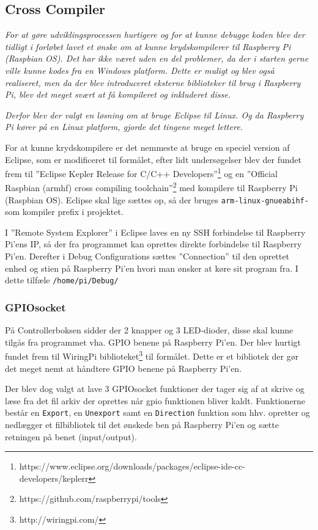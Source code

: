 \subsection*{Cross Compiler}

\textit{For at gøre udviklingsprocessen hurtigere og for at kunne debugge koden blev der tidligt i forløbet lavet et ønske om at kunne krydskompilerer til Raspberry Pi (Raspbian OS). Det har ikke været uden en del problemer, da der i starten gerne ville kunne kodes fra en Windows platform. Dette er muligt og blev også realiseret, men da der blev introduceret eksterne biblioteker til brug i Raspberry Pi, blev det meget svært at få kompileret og inkluderet disse.}

\textit{Derfor blev der valgt en løsning om at bruge Eclipse til Linux. Og da Raspberry Pi kører på en Linux platform, gjorde det tingene meget lettere.}

For at kunne krydskompilere er det nemmeste at bruge en speciel version af Eclipse, som er modificeret til formålet, efter lidt undersøgelser blev der fundet frem til ''Eclipse Kepler Release for C/C++ Developers''\footnote{https://www.eclipse.org/downloads/packages/eclipse-ide-cc-developers/keplerr} og en ''Official Raspbian (armhf) cross compiling toolchain''\footnote{https://github.com/raspberrypi/tools} med kompilere til Raspberry Pi (Raspbian OS). Eclipse skal lige sættes op, så der bruges \verb+arm-linux-gnueabihf-+ som kompiler prefix i projektet.

I ''Remote System Explorer'' i Eclipse laves en ny SSH forbindelse til Raspberry Pi'ens IP, så der fra programmet kan oprettes direkte forbindelse til Raspberry Pi'en. Derefter i Debug Configurations sættes ''Connection'' til den oprettet enhed og stien på Raspberry Pi'en hvori man ønsker at køre sit program fra. I dette tilfæle \verb+/home/pi/Debug/+

\subsubsection*{GPIOsocket}

På Controllerboksen sidder der 2 knapper og 3 LED-dioder, disse skal kunne tilgås fra programmet vha. GPIO benene på Raspberry Pi'en. Der blev hurtigt fundet frem til WiringPi biblioteket\footnote{http://wiringpi.com/} til formålet. Dette er et bibliotek der gør det meget nemt at håndtere GPIO benene på Raspberry Pi'en.

Der blev dog valgt at lave 3 GPIOsocket funktioner der tager sig af at skrive og læse fra det fil arkiv der oprettes når gpio funktionen bliver kaldt. Funktionerne består en \verb+Export+, en \verb+Unexport+ samt en \verb+Direction+ funktion som hhv. opretter og nedlægger et filbibliotek til det ønskede ben på Raspberry Pi'en og sætte retningen på benet (input/output).

